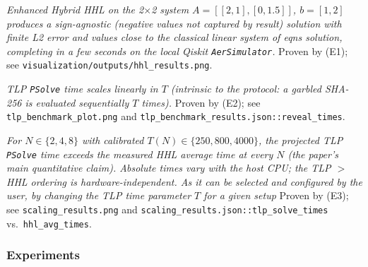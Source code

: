 \documentclass[nonacm,sigconf]{acmart}
\begin{document}
\begin{compactitem}
\item[(C1):] \emph{Enhanced Hybrid HHL on the 2$\times$2 system
  $A=[[2,1],[0,1.5]]$, $b=[1,2]$ produces a sign-agnostic (negative values
  not captured by result) solution with finite L2 error and values close to the classical
  linear system of eqns solution, completing in a few seconds on the local Qiskit
  \texttt{AerSimulator}.}
  Proven by (E1); see
  \texttt{visualization/}\-\texttt{outputs/}\-\texttt{hhl\_results.png}.

\item[(C2):] \emph{TLP \texttt{PSolve} time scales linearly in $T$
  (intrinsic to the protocol: a garbled SHA-256 is evaluated
  sequentially $T$ times).}
  Proven by (E2); see \texttt{tlp\_benchmark\_plot.png} and
  \texttt{tlp\_benchmark\_results.json::reveal\_times}.

\item[(C3):] \emph{For $N \in \{2, 4, 8\}$ with calibrated
  $T(N) \in \{250, 800, 4000\}$, the projected TLP \texttt{PSolve}
  time exceeds the measured HHL average time at every $N$ (the
  paper's main quantitative claim).  Absolute times vary with the
  host CPU; the TLP $>$ HHL ordering is hardware-independent. As it 
  can be selected and configured by the user, by changing the TLP time parameter $T$ for a given
  setup}
  Proven by (E3); see \texttt{scaling\_results.png} and
  \texttt{scaling\_results.json::tlp\_solve\_times} vs.\
  \texttt{hhl\_avg\_times}.
\end{compactitem}

\subsubsection{Experiments}
\end{document}
